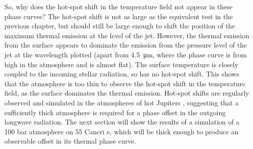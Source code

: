 So, why does the hot-spot shift in the temperature field not appear in these phase curves? The hot-spot shift is not as large as the equivalent test in the previous chapter, but should still be large enough to shift the position of the maximum thermal emission at the level of the jet. However, the thermal emission from the surface appears to dominate the emission from the pressure level of the jet at the wavelength plotted (apart from \SI{4.5}{\micro\metre}, where the phase curve is from high in the atmosphere and is almost flat). The surface temperature is closely coupled to the incoming stellar radiation, so has no hot-spot shift. This shows that the atmosphere is too thin to observe the hot-spot shift in the temperature field, as the surface dominates the thermal emission. Hot-spot shifts are regularly observed and simulated in the atmospheres of hot Jupiters \citep{zellem2014hd209, showman2015circulation}, suggesting that a sufficiently thick atmosphere is required for a phase offset in the outgoing longwave radiation. The next section will show the results of a simulation of a 100 bar atmosphere on 55 Cancri e, which will be thick enough to produce an observable offset in its thermal phase curve.

%

